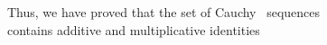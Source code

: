 \documentclass[preview]{standalone}
\begin{document}
\begin{center}
Thus, we have proved that the set of Cauchy \, sequences\\contains additive and multiplicative identities
\end{center}
\end{document}
